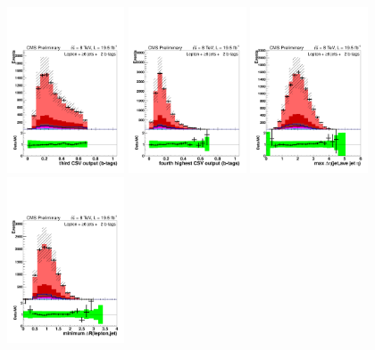 \begin{figure}[hbtp]
\begin{center}
   \includegraphics[width=0.31\textwidth]{Figures/Analysis_2_Diagrams/LJ_plots_lep/6j2t/lep_jet_csv_3_6j2t_cumulative_wRatio_noLegend_lin.pdf}
   \includegraphics[width=0.31\textwidth]{Figures/Analysis_2_Diagrams/LJ_plots_lep/6j2t/lep_jet_csv_4_6j2t_cumulative_wRatio_noLegend_lin.pdf}
   \includegraphics[width=0.31\textwidth]{Figures/Analysis_2_Diagrams/LJ_plots_lep/6j2t/lep_maxeta_jet_jet_6j2t_cumulative_wRatio_noLegend_lin.pdf}
   \includegraphics[width=0.31\textwidth]{Figures/Analysis_2_Diagrams/LJ_plots_lep/6j2t/lep_min_dR_lep_jet_6j2t_cumulative_wRatio_noLegend_lin.pdf}

\end{center}
\end{figure}

